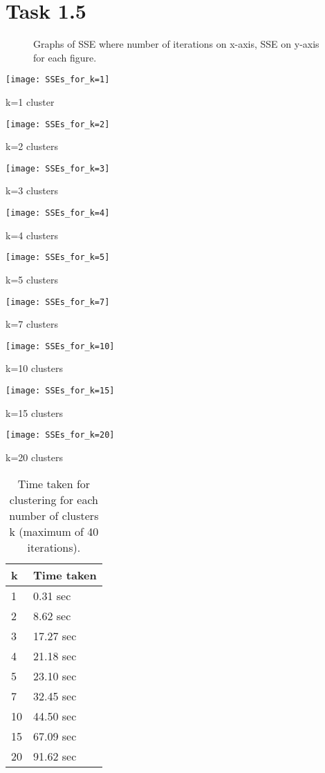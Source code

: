 \documentclass[12pt]{extarticle}
\begin{document}
\section{Task 1.5}
\begin{figure}[h!]
\caption{Graphs of SSE where number of iterations on x-axis, SSE on y-axis for each figure.}
\end{figure}
{\centering
\texttt{[image: SSEs\_for\_k=1]}
\begin{center}
k=1 cluster
\end{center}
\texttt{[image: SSEs\_for\_k=2]}
\begin{center}
k=2 clusters
\end{center}
\texttt{[image: SSEs\_for\_k=3]}
\begin{center}
k=3 clusters
\end{center}
\texttt{[image: SSEs\_for\_k=4]}
\begin{center}
k=4 clusters
\end{center}
\texttt{[image: SSEs\_for\_k=5]}
\begin{center}
k=5 clusters
\end{center}
\texttt{[image: SSEs\_for\_k=7]}
\begin{center}
k=7 clusters
\end{center}
\texttt{[image: SSEs\_for\_k=10]}
\begin{center}
k=10 clusters
\end{center}
\texttt{[image: SSEs\_for\_k=15]}
\begin{center}
k=15 clusters
\end{center}
\texttt{[image: SSEs\_for\_k=20]}
\begin{center}
k=20 clusters
\end{center}
}

\hfill
\begin{table}[h!]
\centering
\caption{Time taken for clustering for each number of clusters k (maximum of 40 iterations).}
\begin{tabular}{ |p{3cm}|p{3cm}|  }
 \hline
 k&Time taken\\
 \hline
 1&0.31 sec\\
 2&8.62 sec\\
 3&17.27 sec\\
 4&21.18 sec\\
 5&23.10 sec\\
 7&32.45 sec\\
 10&44.50 sec\\
 15&67.09 sec\\
 20&91.62 sec\\
 \hline
\end{tabular}
\end{table}
\pagebreak
\end{document}
